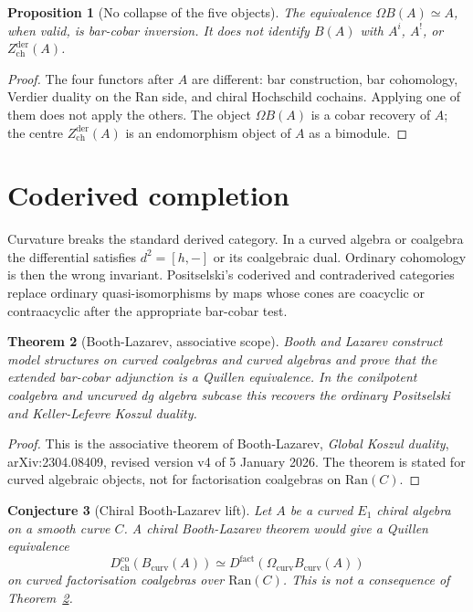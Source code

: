 \documentclass[11pt]{amsart}
\newtheorem{theorem}{Theorem}[section]
\newtheorem{proposition}[theorem]{Proposition}
\newtheorem{conjecture}[theorem]{Conjecture}
\newcommand{\Dco}{D^{\mathrm{co}}}
\newcommand{\Ran}{\mathrm{Ran}}
\newcommand{\Zchder}{Z^{\mathrm{der}}_{\mathrm{ch}}}
\begin{document}
\begin{proposition}[No collapse of the five objects]
\label{prop:five-object-separation}
The equivalence $\Omega B(A)\simeq A$, when valid, is bar-cobar
inversion.  It does not identify $B(A)$ with $A^i$, $A^!$, or
$\Zchder(A)$.
\end{proposition}

\begin{proof}
The four functors after $A$ are different: bar construction, bar
cohomology, Verdier duality on the Ran side, and chiral Hochschild
cochains.  Applying one of them does not apply the others.  The object
$\Omega B(A)$ is a cobar recovery of $A$; the centre
$\Zchder(A)$ is an endomorphism object of $A$ as a bimodule.
\end{proof}

\section{Coderived completion}

Curvature breaks the standard derived category.  In a curved algebra
or coalgebra the differential satisfies $d^2=[h,-]$ or its coalgebraic
dual.  Ordinary cohomology is then the wrong invariant.  Positselski's
coderived and contraderived categories replace ordinary quasi-isomorphisms
by maps whose cones are coacyclic or contraacyclic after the appropriate
bar-cobar test.

\begin{theorem}[Booth-Lazarev, associative scope]
\label{thm:booth-lazarev-scope}
Booth and Lazarev construct model structures on curved coalgebras and
curved algebras and prove that the extended bar-cobar adjunction is a
Quillen equivalence.  In the conilpotent coalgebra and uncurved dg
algebra subcase this recovers the ordinary Positselski and
Keller-Lefevre Koszul duality.
\end{theorem}

\begin{proof}
This is the associative theorem of Booth-Lazarev, \emph{Global Koszul
duality}, arXiv:2304.08409, revised version v4 of 5 January 2026.
The theorem is stated for curved algebraic objects, not for
factorisation coalgebras on $\Ran(C)$.
\end{proof}

\begin{conjecture}[Chiral Booth-Lazarev lift]
\label{conj:chiral-booth-lazarev}
Let $A$ be a curved $E_1$ chiral algebra on a smooth curve $C$.  A
chiral Booth-Lazarev theorem would give a Quillen equivalence
\[
 \Dco_{\mathrm{ch}}(B_{\mathrm{curv}}(A))
 \simeq
 D^{\mathrm{fact}}(\Omega_{\mathrm{curv}}B_{\mathrm{curv}}(A))
\]
on curved factorisation coalgebras over $\Ran(C)$.
This is not a consequence of Theorem~\ref{thm:booth-lazarev-scope}.
\end{conjecture}
\end{document}
